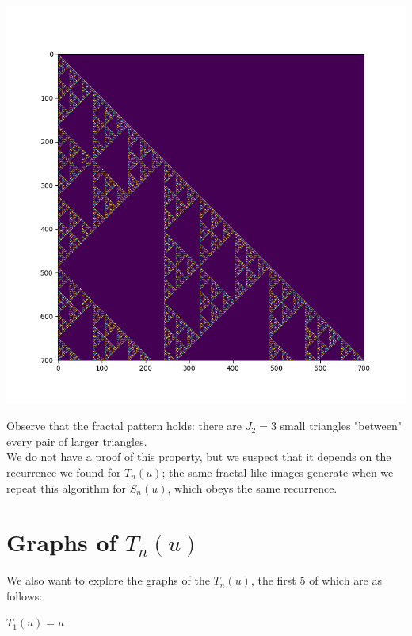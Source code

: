 \documentclass[12pt, letterpaper]{article} %
\begin{document}
\begin{center}
      \includegraphics[scale=0.44]{700mod3.png}
\end{center}

Observe that the fractal pattern holds: there are $J_2 = 3$ small triangles "between" every pair of larger triangles. \\

We do not have a proof of this property, but we suspect that it depends on the recurrence we found for $T_n(u)$; the same fractal-like images generate when we repeat this algorithm for $S_n(u)$, which obeys the same recurrence.

\pagebreak
\section{Graphs of $T_n(u)$}
We also want to explore the graphs of the $T_n(u)$, the first 5 of which are as follows:
\vspace{36pt}
 \begin{center}
   \end{center}
  \begin{center}$T_1(u) = u$ \end{center}
\end{document}
